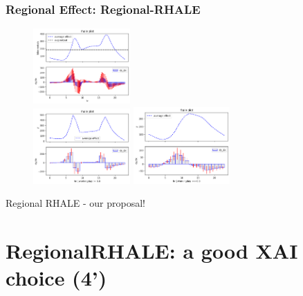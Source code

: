 \documentclass{beamer}
\begin{document}
\begin{frame}
  \frametitle{Regional Effect: Regional-RHALE}
  \begin{figure}[ht]
    \centering
    \includegraphics[width=0.33\textwidth]{./figures/bike_sharing_global_rhale_heterogeneity.png} \\
    \includegraphics[width=0.33\textwidth]{./figures/bike_sharing_regional_rhale_workingdays.png}
    \includegraphics[width=0.33\textwidth]{./figures/bike_sharing_regional_rhale_weekends.png}
  \end{figure}
  \noindent\makebox[\linewidth]{\rule{\paperwidth}{0.4pt}}
  Regional RHALE - our proposal!
\end{frame}

\section{RegionalRHALE: a good XAI choice (4')}
\end{document}
